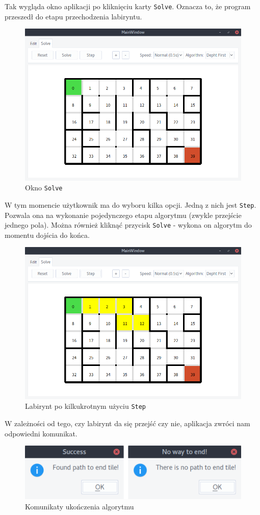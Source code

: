 \documentclass[12pt,a4paper]{article}
\begin{document}
	Tak wygląda okno aplikacji po kliknięciu karty \texttt{Solve}.
	Oznacza to, że program przeszedł do etapu przechodzenia labiryntu.
	\begin{figure}[H]
		\centering
		\includegraphics[width=0.8\linewidth]{obrazki/5.png}
		\caption{Okno \texttt{Solve}}
	\end{figure}
	
	W tym momencie użytkownik ma do wyboru kilka opcji. Jedną z nich
	jest \texttt{Step}. Pozwala ona na wykonanie pojedynczego etapu
	algorytmu (zwykle przejście jednego pola). Można również kliknąć
	przycisk \texttt{Solve} - wykona on algorytm do momentu dojścia do 
	końca.
	\begin{figure}[H]
		\centering
		\includegraphics[width=0.8\linewidth]{obrazki/6.png}
		\caption{Labirynt po kilkukrotnym użyciu \texttt{Step}}
	\end{figure}
	
	W zależności od tego, czy labirynt da się przejść czy nie, aplikacja
	zwróci nam odpowiedni komunikat.
	\begin{figure}[H]
		\centering
		\includegraphics[width=0.8\linewidth]{obrazki/7i8.png}
		\caption{Komunikaty ukończenia algorytmu}
	\end{figure}
	
\end{document}
